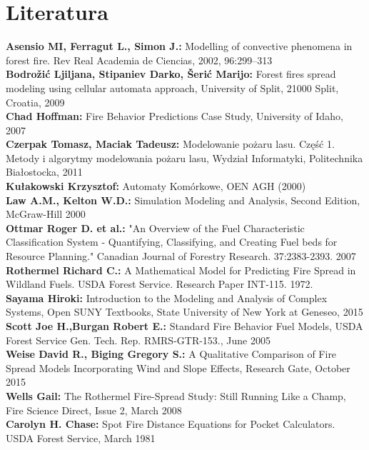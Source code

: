 \documentclass[a4paper, 11pt]{article}
\begin{document}
	\section{Literatura}
	\textbf{Asensio MI, Ferragut L., Simon J.:} Modelling of convective phenomena in forest fire. Rev Real Academia de Ciencias, 2002, 96:299–313\\
	\textbf{Bodrožić Ljiljana, Stipaniev Darko, Šerić Marijo:} Forest fires spread modeling using cellular automata approach, University of Split, 21000 Split, Croatia, 2009 \\
	\textbf{Chad Hoffman:} Fire Behavior Predictions Case Study, University of Idaho, 2007\\
	\textbf{Czerpak Tomasz, Maciak Tadeusz:} Modelowanie pożaru lasu. Część 1. Metody i algorytmy modelowania pożaru lasu, Wydział Informatyki, Politechnika Białostocka, 2011 \\
	\textbf{Kułakowski Krzysztof:} Automaty Komórkowe, OEN AGH (2000) \\
	\textbf{Law A.M., Kelton W.D.:} Simulation Modeling and Analysis, Second Edition, McGraw-Hill 2000\\
	\textbf{Ottmar Roger D. et al.:} "An Overview of the Fuel Characteristic Classification System - Quantifying, Classifying, and Creating Fuel beds for Resource Planning." Canadian Journal of Forestry Research. 37:2383-2393. 2007\\
	\textbf{Rothermel Richard C.:} A Mathematical Model for Predicting Fire Spread in Wildland Fuels. USDA Forest Service. Research Paper INT-115. 1972.\\
	\textbf{Sayama Hiroki:} Introduction to the Modeling and Analysis of Complex Systems, Open SUNY Textbooks, State University of New York at Geneseo, 2015\\	
	\textbf{Scott Joe H.,Burgan Robert E.:} Standard Fire Behavior Fuel Models, USDA Forest Service Gen. Tech. Rep. RMRS-GTR-153., June 2005\\	
	\textbf{Weise David R., Biging Gregory S.:} A Qualitative Comparison of Fire Spread Models Incorporating Wind and Slope Effects, Research Gate, October 2015\\
	\textbf{Wells Gail:} The Rothermel Fire-Spread Study: Still Running Like a Champ, Fire Science Direct, Issue 2, March 2008\\
	\textbf{Carolyn H. Chase:} Spot Fire Distance Equations for Pocket Calculators. USDA Forest Service, March 1981\\ 
	
	
	
	
\end{document}
